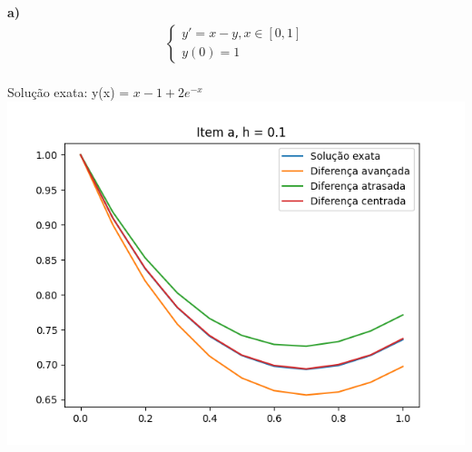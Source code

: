 \textbf{a)}
    \begin{align*}
    \begin{cases}
        y' = x - y, x \in [0, 1] \\
        y(0) = 1
    \end{cases}
    \end{align*}
    \\
    Solução exata: y(x) = $x - 1 + 2e^{-x}$\\\includegraphics{a_h_0.1.png}
        \\
